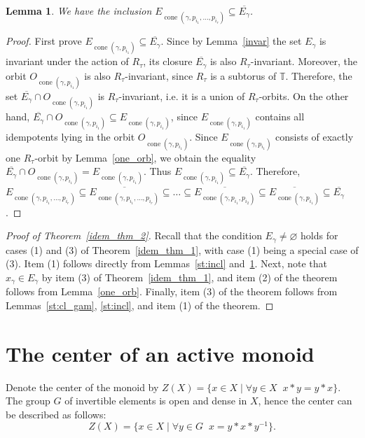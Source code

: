 \documentclass[a4paper, 11pt]{amsart}
\theoremstyle{plain}
\newtheorem{lemma}[theorem]{Lemma}
\theoremstyle{remark}
\theoremstyle{definition}
\newcommand{\TT}{\mathbb{T}}
\newcommand{\ol}[1]{\overline{#1}}
\DeclareMathOperator{\cone}{cone}
\begin{document}
\begin{lemma}\label{st:incl2}
We have the inclusion $E_{\cone(\gamma, p_{i_1}, \ldots, p_{i_r})} \subseteq \ol{E_\gamma}$.
\end{lemma}

\begin{proof}
First prove $E_{\cone(\gamma, p_{i_1})} \subseteq \ol{E_\gamma}$. Since by Lemma~\ref{invar} the set $E_\gamma$ is invariant under the action of $R_\tau$, its closure $\ol{E_\gamma}$ is also $R_\tau$-invariant. Moreover, the orbit $O_{\cone(\gamma, p_{i_1})}$ is also $R_\tau$-invariant, since $R_\tau$ is a subtorus of $\TT$. Therefore, the set $\ol{E_\gamma} \cap O_{\cone(\gamma, p_{i_1})}$ is $R_\tau$-invariant, i.e. it is a union of $R_\tau$-orbits. On the other hand, $\ol{E_\gamma} \cap O_{\cone(\gamma, p_{i_1})} \subseteq E_{\cone(\gamma, p_{i_1})}$, since $E_{\cone(\gamma, p_{i_1})}$ contains all idempotents lying in the orbit $O_{\cone(\gamma, p_{i_1})}$. Since $E_{\cone(\gamma, p_{i_1})}$ consists of exactly one $R_\tau$-orbit by Lemma~\ref{one_orb}, we obtain the equality $\ol{E_\gamma} \cap O_{\cone(\gamma, p_{i_1})} = E_{\cone(\gamma, p_{i_1})}$. Thus $E_{\cone(\gamma, p_{i_1})} \subseteq  \ol{E_\gamma}$. Therefore, $E_{\cone(\gamma, p_{i_1}, \ldots, p_{i_r})} \subseteq \ol{E_{\cone(\gamma, p_{i_1}, \ldots, p_{i_r})}} \subseteq \ldots  \subseteq \ol{E_{\cone(\gamma, p_{i_1}, p_{i_2})}} \subseteq \ol{E_{\cone(\gamma, p_{i_1})}} \subseteq  \ol{E_\gamma}$. 
\end{proof}

\begin{proof}[Proof of Theorem~\ref{idem_thm_2}]
Recall that the condition $E_\gamma \neq \varnothing$ holds for cases (1) and (3) of Theorem~\ref{idem_thm_1}, with case (1) being a special case of (3).  
Item (1) follows directly from Lemmas~\ref{st:incl} and~\ref{st:incl2}. Next, note that $x_\gamma \in E_\gamma$ by item (3) of Theorem~\ref{idem_thm_1}, and item (2) of the theorem follows from Lemma~\ref{one_orb}. Finally, item (3) of the theorem follows from Lemmas~\ref{st:cl_gam}, \ref{st:incl}, and item (1) of the theorem.   
\end{proof}

\section{The center of an active monoid}\label{sec:center}

Denote the center of the monoid by $Z(X) = \{x \in X \mid \forall y \in X\;\; x*y = y*x\}$. The group $G$ of invertible elements is open and dense in $X$, hence the center can be described as follows: \[Z(X) = \{x \in X \mid \forall y \in G \;\;x = y*x *y^{-1}\}.\] 
\end{document}
